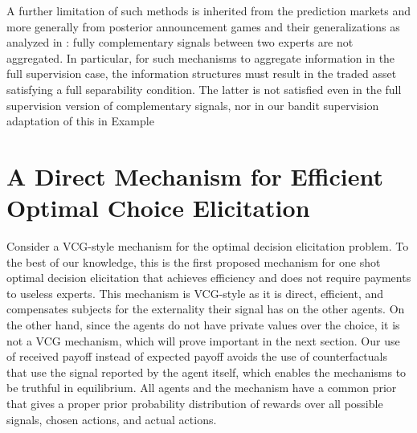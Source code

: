 


A further limitation of such methods is inherited from the prediction markets and more generally from posterior announcement games and their generalizations as analyzed in \cite{ostrovsky2012information}: fully complementary signals between two experts are not aggregated. In particular, for such mechanisms to aggregate information in the full supervision case, the information structures must result in the traded asset satisfying a full separability condition. The latter is not satisfied even in the full supervision version of complementary signals, nor in our bandit supervision adaptation of this in Example~



\section{A Direct Mechanism for Efficient Optimal Choice Elicitation}

Consider a VCG-style mechanism for the optimal decision elicitation problem. 
To the best of our knowledge, this is the first proposed mechanism for one shot optimal decision elicitation that achieves efficiency and does not require payments to useless experts.
This mechanism is VCG-style as it is direct, efficient, and compensates subjects for the externality their signal has on the other agents.
On the other hand, since the agents do not have private values over the choice, it is not a VCG mechanism, which will prove important in the next section.
Our use of received payoff instead of expected payoff avoids the use of counterfactuals that use the signal reported by the agent itself, which enables the mechanisms to be truthful in equilibrium.
All agents and the mechanism have a common prior that gives a proper prior probability distribution of rewards over all possible signals, chosen actions, and actual actions.

